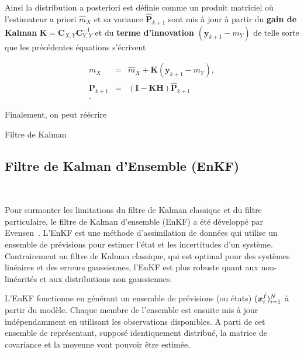 Ainsi la distribution a posteriori est définie comme un produit matriciel où l'estimateur a priori $\hat m_X$ et sa variance $\hat{\bm  P}_{k+1}$ sont mis à jour à partir du \textbf{gain de Kalman} $\bm K = \bm C_{X,Y} \bm C_{Y,Y}^{-1} $ et du \textbf{terme d'innovation} $(\bm y_{k+1} - m_Y)$ de telle sorte que les précédentes équations s'écrivent

\begin{eqnarray*}
    m_X &=& \hat m_X + \bm K (\bm y_{k+1} - m_Y), \\
    \bm P_{k+1} &=& (\bm I - \bm K\bm H)\hat{\bm  P}_{k+1} \\.
\end{eqnarray*}

Finalement, on peut réécrire
\begin{algorithm}
    \caption{Filtre de Kalman}
\end{algorithm}

\subsection{Filtre de Kalman d'Ensemble (EnKF)}~\label{sec:enkf}

Pour surmonter les limitations du filtre de Kalman classique et du filtre particulaire, le filtre de Kalman d'ensemble (EnKF) a été développé par Evensen~\cite{evensen_sequential_1994}. L'EnKF est une méthode d'assimilation de données qui utilise un ensemble de prévisions pour estimer l'état et les incertitudes d'un système. Contrairement au filtre de Kalman classique, qui est optimal pour des systèmes linéaires et des erreurs gaussiennes, l'EnKF est plus robuste quant aux non-linéarités et aux distributions non gaussiennes.

L'EnKF fonctionne en générant un ensemble de prévisions  (ou états) $(\bm{x}_i^f)_{i=1}^N$ à partir du modèle. Chaque membre de l'ensemble est ensuite mis à jour indépendamment en utilisant les observations disponibles. A parti de cet ensemble de représentant, supposé identiquement distribué, la matrice de covariance et la moyenne vont pouvoir être estimée.

